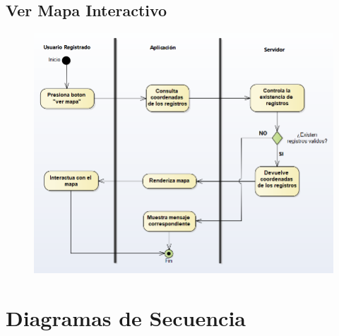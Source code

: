 		\subsection{Ver Mapa Interactivo}
			\begin{figure}[H]
			\centering
				\includegraphics[width=1\textwidth]{imagenes/analisis/diagrama-actividad-ver-mapa.png}
				\label{fig:diagrama-actividad-comprar-producto}
				\end{figure}
			

	\section{Diagramas de Secuencia}
